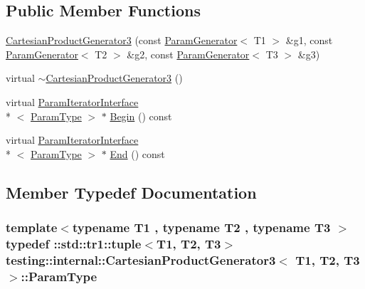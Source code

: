 \subsection*{Public Member Functions}
\begin{DoxyCompactItemize}
\item 
\hyperlink{classtesting_1_1internal_1_1_cartesian_product_generator3_afdca1e94b01f654564b9cbe66fb5ca94}{Cartesian\-Product\-Generator3} (const \hyperlink{classtesting_1_1internal_1_1_param_generator}{Param\-Generator}$<$ T1 $>$ \&g1, const \hyperlink{classtesting_1_1internal_1_1_param_generator}{Param\-Generator}$<$ T2 $>$ \&g2, const \hyperlink{classtesting_1_1internal_1_1_param_generator}{Param\-Generator}$<$ T3 $>$ \&g3)
\item 
virtual \hyperlink{classtesting_1_1internal_1_1_cartesian_product_generator3_ab99913e4d1052b940e593cbdceb5d47a}{$\sim$\-Cartesian\-Product\-Generator3} ()
\item 
virtual \hyperlink{classtesting_1_1internal_1_1_param_iterator_interface}{Param\-Iterator\-Interface}\\*
$<$ \hyperlink{classtesting_1_1internal_1_1_cartesian_product_generator3_a8819b73a6af2ecca7d25e09f759f2757}{Param\-Type} $>$ $\ast$ \hyperlink{classtesting_1_1internal_1_1_cartesian_product_generator3_a0964b5fe9c9122e850ab5cdc79b1667a}{Begin} () const 
\item 
virtual \hyperlink{classtesting_1_1internal_1_1_param_iterator_interface}{Param\-Iterator\-Interface}\\*
$<$ \hyperlink{classtesting_1_1internal_1_1_cartesian_product_generator3_a8819b73a6af2ecca7d25e09f759f2757}{Param\-Type} $>$ $\ast$ \hyperlink{classtesting_1_1internal_1_1_cartesian_product_generator3_a3ec67f2625c4bf090308e8f5fc511838}{End} () const 
\end{DoxyCompactItemize}


\subsection{Member Typedef Documentation}
\hypertarget{classtesting_1_1internal_1_1_cartesian_product_generator3_a8819b73a6af2ecca7d25e09f759f2757}{
\subsubsection[{Param\-Type}]{\setlength{\rightskip}{0pt plus 5cm}template$<$typename T1 , typename T2 , typename T3 $>$ typedef \-::{\bf std\-::tr1\-::tuple}$<$T1, T2, T3$>$ {\bf testing\-::internal\-::\-Cartesian\-Product\-Generator3}$<$ T1, T2, T3 $>$\-::{\bf Param\-Type}}}\label{classtesting_1_1internal_1_1_cartesian_product_generator3_a8819b73a6af2ecca7d25e09f759f2757}



